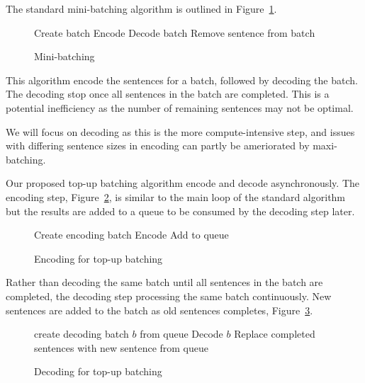 \documentclass[]{article}
\begin{document}
The standard mini-batching algorithm is outlined in Figure~\ref{algo:Mini-batching}.

\begin{figure} [h]
\begin{algorithmic}
  \STATE Create batch
  \STATE Encode
    \STATE Decode batch
        \STATE Remove sentence from batch
      \ENDIF
    \ENDFOR
  \ENDWHILE
\ENDWHILE 
\end{algorithmic}
\caption{Mini-batching}
\label{algo:Mini-batching}
\end{figure}

This algorithm encode the sentences for a batch, followed by decoding the batch. The decoding stop once all sentences in the batch are completed. This is a potential inefficiency as the number of remaining sentences may not be optimal.

We will focus on decoding as this is the more compute-intensive step, and issues with differing sentence sizes in encoding can partly be ameriorated by maxi-batching.

Our proposed top-up batching algorithm encode and decode asynchronously. The encoding step, Figure~\ref{algo:Encoding for top-up batching}, is similar to the main loop of the standard algorithm but the results are added to a queue to be consumed by the decoding step later.

\begin{figure} [h]
\begin{algorithmic}
  \STATE Create encoding batch
  \STATE Encode
  \STATE Add to queue
\ENDWHILE 
\end{algorithmic}
\caption{Encoding for top-up batching}
\label{algo:Encoding for top-up batching}
\end{figure}

Rather than decoding the same batch until all sentences in the batch are completed, the decoding step processing the same batch continuously. New sentences are added to the batch as old sentences completes, Figure~\ref{algo:Decoding for top-up batching}.

\begin{figure} [h]
\begin{algorithmic}
\STATE create decoding batch $b$ from queue
  \STATE Decode $b$
  \STATE Replace completed sentences with new sentence from queue
\ENDWHILE 
\end{algorithmic}
\caption{Decoding for top-up batching}
\label{algo:Decoding for top-up batching}
\end{figure}
\end{document}
